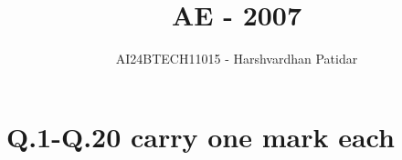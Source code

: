 \documentclass[journal]{IEEEtran}
\begin{document}

\vspace{3cm}

\title{AE - 2007}
\author{AI24BTECH11015 - Harshvardhan Patidar}
 \maketitle
{\let\newpage\relax\maketitle}

\renewcommand{\thefigure}{\theenumi}
\renewcommand{\thetable}{\theenumi}
\setlength{\intextsep}{10pt} %


\renewcommand{\thetable}{\theenumi}

\section*{Q.1-Q.20 carry one mark each}
\end{document}
